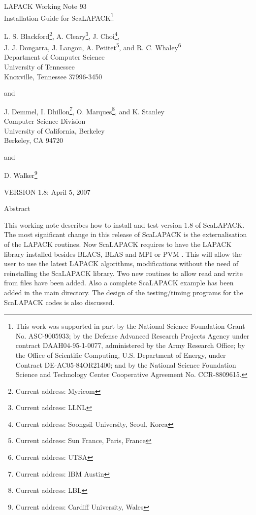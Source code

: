 \documentclass[11pt]{report}
\begin{document}
\begin{center}
  {\Large LAPACK Working Note 93\\
  Installation Guide for ScaLAPACK\footnote{This work was supported
in part by the National Science Foundation Grant No. ASC-9005933; by
the Defense Advanced Research Projects Agency under contract
DAAH04-95-1-0077, administered by the Army Research Office;
by the Office of Scientific Computing,
U.S. Department of Energy, under Contract
DE-AC05-84OR21400; and
by the National Science
Foundation Science and Technology Center Cooperative
Agreement No. CCR-8809615.}}
\end{center}
\begin{center}
L. S. Blackford\footnote{Current address:  Myricom}, A. Cleary\footnote{Current address:  LLNL}, J. Choi\footnote{Current address: Soongsil University, Seoul,
Korea}, \\
J. J. Dongarra, J. Langou, A. Petitet\footnote{Current address: Sun France, Paris, France}, and R. C. Whaley\footnote{Current address:  UTSA}\\
Department of Computer Science \\
University of Tennessee \\
Knoxville, Tennessee  37996-3450 \\
\end{center}
\begin{center}
and
\end{center}
\begin{center}
J. Demmel, I. Dhillon\footnote{Current address: IBM Austin}, O. Marques\footnote{Current address:  LBL}, and K. Stanley \\
   Computer Science Division \\
   University of California, Berkeley \\
   Berkeley, CA 94720 \\
\end{center}
\begin{center}
and
\end{center}
\begin{center}
D. Walker\footnote{Current address:  Cardiff University, Wales} \\
\end{center}
\begin{center}
  VERSION 1.8:  April 5, 2007
\end{center}

\begin{center}
Abstract
\end{center}
This working note describes how to install and test
version 1.8 of ScaLAPACK.
The most significant change in this release of ScaLAPACK 
is the externalisation of the LAPACK routines. Now ScaLAPACK 
requires to have the LAPACK library installed besides BLACS, 
BLAS and MPI or PVM . This will allow the user to use the latest 
LAPACK algorithms, modifications without the need of reinstalling 
the ScaLAPACK library.
Two new routines to allow read and write from files have been added.
Also a complete ScaLAPACK example has been added in the main directory. 
The design of the testing/timing
programs for the ScaLAPACK codes is also discussed. 
\end{document}
